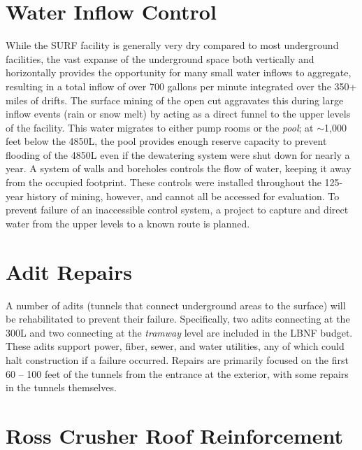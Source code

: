 \section{Water Inflow Control}
\label{ch:fscf-site-prep-water}

While the SURF facility is generally very dry compared to most underground facilities, the vast expanse of the underground space both vertically and horizontally provides the opportunity for many small water inflows to aggregate, resulting in a total inflow of over 700 gallons per minute integrated over the 350+ miles of drifts.  The surface mining of the open cut aggravates this during large inflow events (rain or snow melt) by acting as a direct funnel to the upper levels of the facility.  This water migrates to either pump rooms or the \textit{pool}; at $\sim$1,000 feet below the 4850L, the pool provides enough reserve capacity to prevent flooding of the 4850L even if the dewatering system were shut down for nearly a year. 
A system of walls and boreholes controls the flow of water, keeping it away from the occupied footprint. These controls were installed throughout the 125-year history of mining, however, and cannot all be accessed for evaluation.  To prevent failure of an inaccessible control system, a project to capture and direct water from the upper levels to a known route is planned.
 
\section{Adit Repairs}
\label{ch:fscf-site-prep-adit}

A number of adits (tunnels that connect underground areas to the surface) will be rehabilitated to prevent their failure.  Specifically, two adits connecting at the 300L and two connecting at the \textit{tramway} level are included in the LBNF budget.  These adits support power, fiber, sewer, and water utilities, any of which could halt construction if a failure occurred.  Repairs are primarily focused on the first 60 -- 100 feet of the tunnels from the entrance at the exterior, with some repairs
 in the tunnels themselves.
 
\section{Ross Crusher Roof Reinforcement}
\label{ch:fscf-site-prep-rossroof}

